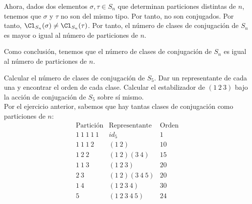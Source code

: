 \begin{ejercicio}
\begin{enumerate}
\begin{description}
            Ahora, dados dos elementos $\sigma,\tau\in S_n$ que determinan particiones distintas de $n$, tenemos que $\sigma$ y $\tau$ no son del mismo tipo. Por tanto, no son conjugados. Por tanto, $\Cl_{S_n}(\sigma)\neq \Cl_{S_n}(\tau)$. Por tanto, el número de clases de conjugación de $S_n$ es mayor o igual al número de particiones de $n$.
        \end{description}

        Como conclusión, tenemos que el número de clases de conjugación de $S_n$ es igual al número de particiones de $n$.
    \end{enumerate}
\end{ejercicio}

\begin{ejercicio}\label{ej:6.10}
    Calcular el número de clases de conjugación de $S_5$. Dar un representante de cada una y encontrar el orden de cada clase. Calcular el estabilizador de $(1\ 2\ 3)$ bajo la acción de conjugación de $S_5$ sobre sí mismo.\\


    Por el ejercicio anterior, sabemos que hay tantas clases de conjugación como particiones de $n$:
    \begin{equation*}
        \begin{array}{l|c|c}
            \text{Partición} & \text{Representante} & \text{Orden}\\ \hline
            1\ 1\ 1\ 1\ 1 & id_{5} & 1\\
            1\ 1\ 1\ 2 & (1\ 2) & 10\\
            1\ 2\ 2 & (1\ 2)(3\ 4) & 15\\
            1\ 1\ 3 & (1\ 2\ 3) & 20\\
            2\ 3 & (1\ 2)(3\ 4\ 5) & 20\\
            1\ 4 & (1\ 2\ 3\ 4) & 30\\
            5 & (1\ 2\ 3\ 4\ 5) & 24
        \end{array}
    \end{equation*}
    

\end{ejercicio}
